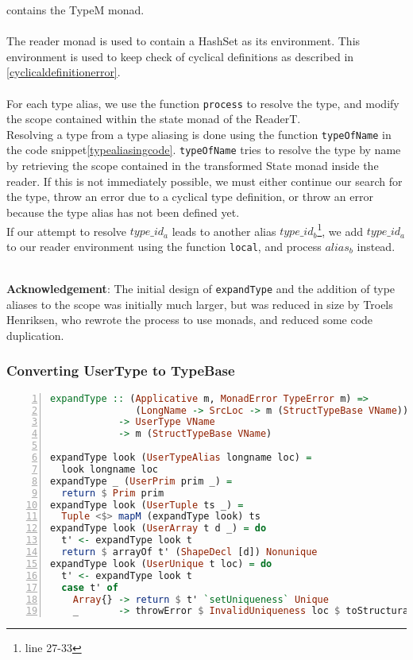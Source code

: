 contains the TypeM monad.
\\
\\
\noindent
The reader monad is used to contain a HashSet as its environment. This
environment is used to keep check of cyclical definitions as described in
\ref{cyclicaldefinitionerror}.
\\
\\
For each type alias, we use the function \texttt{process} to resolve the type, and modify
the scope contained within the state monad of the ReaderT.
\\
Resolving a type from a type aliasing is done using the function \texttt{typeOfName} in
the code snippet\ref{typealiasingcode}. \texttt{typeOfName} tries to
resolve the type by name by retrieving the scope contained in the transformed
State monad inside the reader.
\clearpage
\noindent
If this is not immediately possible, we must either continue our search for the type, throw an error due to a cyclical type definition, or throw an error because the type alias has not been defined yet.
\\
If our attempt to resolve $type\_id_a$ leads to another alias
$type\_id_b$\footnote{line 27-33}, we add
$type\_id_a$ to our reader environment using the function \texttt{local}, and
process $alias_b$ instead.
\\
\\
\begin{tcolorbox}
\textbf{Acknowledgement}: The initial design of \texttt{expandType} and the addition of
type aliases to the scope was initially much larger, but was reduced in size by
Troels Henriksen, who rewrote the process to use monads, and reduced some code
duplication. 
\end{tcolorbox}
\subsubsection{Converting UserType to TypeBase}
\begin{lstlisting}[language=Haskell, numbers=left]
expandType :: (Applicative m, MonadError TypeError m) =>
               (LongName -> SrcLoc -> m (StructTypeBase VName))
            -> UserType VName
            -> m (StructTypeBase VName)

expandType look (UserTypeAlias longname loc) =
  look longname loc
expandType _ (UserPrim prim _) =
  return $ Prim prim
expandType look (UserTuple ts _) =
  Tuple <$> mapM (expandType look) ts
expandType look (UserArray t d _) = do
  t' <- expandType look t
  return $ arrayOf t' (ShapeDecl [d]) Nonunique
expandType look (UserUnique t loc) = do
  t' <- expandType look t
  case t' of
    Array{} -> return $ t' `setUniqueness` Unique
    _       -> throwError $ InvalidUniqueness loc $ toStructural t'

\end{lstlisting}

